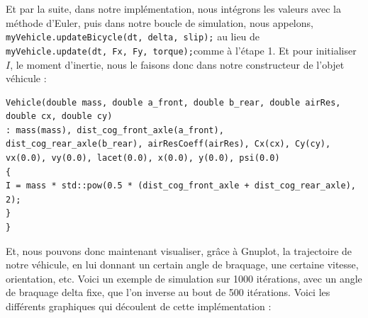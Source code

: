 Et par la suite, dans notre implémentation, nous intégrons les valeurs avec la méthode d'Euler, puis dans notre boucle de simulation, nous appelons, \texttt{myVehicle.updateBicycle(dt, delta, slip);} au lieu de \texttt{myVehicle.update(dt, Fx, Fy, torque);}comme à l'étape 1. Et pour initialiser $I$, le moment d'inertie, nous le faisons donc dans notre constructeur de l'objet véhicule :
\begin{lstlisting}[style=CStyle]
Vehicle(double mass, double a_front, double b_rear, double airRes, double cx, double cy)
: mass(mass), dist_cog_front_axle(a_front), dist_cog_rear_axle(b_rear), airResCoeff(airRes), Cx(cx), Cy(cy), vx(0.0), vy(0.0), lacet(0.0), x(0.0), y(0.0), psi(0.0)
{
I = mass * std::pow(0.5 * (dist_cog_front_axle + dist_cog_rear_axle), 2);
}
}
\end{lstlisting}

Et, nous pouvons donc maintenant visualiser, grâce à Gnuplot, la trajectoire de notre véhicule, en lui donnant un certain angle de braquage, une certaine vitesse, orientation, etc. Voici un exemple de simulation sur 1000 itérations, avec un angle de braquage delta fixe, que l'on inverse au bout de 500 itérations.
Voici les différents graphiques qui découlent de cette implémentation :


